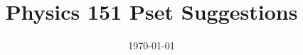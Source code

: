 \documentclass[12pt]{article}
\theoremstyle{defstyle}
\theoremstyle{remarkstyle}
\numberwithin{equation}{section}
\numberwithin{corollary}{section}
\numberwithin{definition}{section}
\numberwithin{theorem}{section}
\numberwithin{remark}{section}
\numberwithin{example}{section}
\begin{document}
\title{Physics 151 Pset Suggestions}
\date{\today}
\maketitle

\pagebreak

\end{document}
